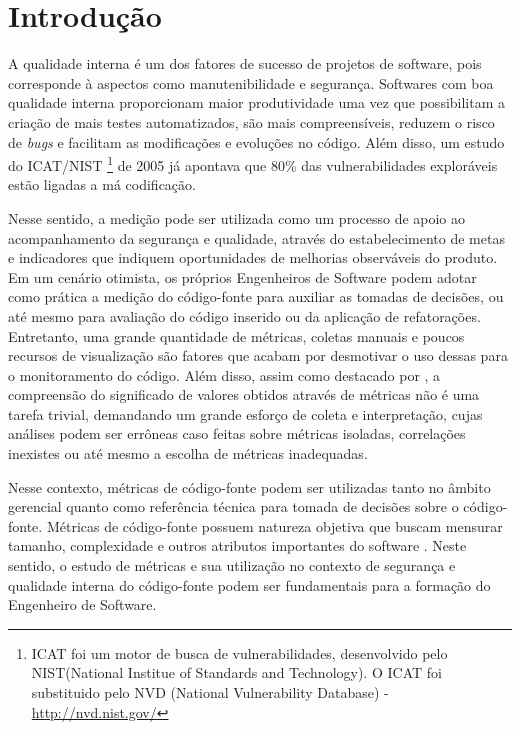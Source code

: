 \section{Introdução}
\label{introduction}

A qualidade interna é um dos fatores de sucesso de projetos de software, pois corresponde à aspectos como manutenibilidade e segurança. Softwares com boa qualidade interna proporcionam maior produtividade uma vez que possibilitam a criação de mais testes automatizados, são mais compreensíveis, reduzem o risco de \emph{bugs} e facilitam as modificações e evoluções no código.
%
Além disso, um estudo do ICAT/NIST
%
\footnote{ICAT foi um motor de busca de vulnerabilidades, desenvolvido pelo NIST(National Institue of Standards and Technology). O ICAT foi substituido pelo NVD (National Vulnerability Database) - \url{http://nvd.nist.gov/}}
%
de 2005 já apontava que 80\% das vulnerabilidades exploráveis estão ligadas a má codificação.

Nesse sentido, a medição pode ser utilizada como um processo de apoio ao acompanhamento da segurança e qualidade, através do estabelecimento de metas e indicadores que indiquem oportunidades de melhorias observáveis do produto. Em um cenário otimista,
os próprios Engenheiros de Software podem adotar como prática a medição do código-fonte para auxiliar as tomadas de decisões, ou até mesmo para avaliação do código inserido ou da aplicação de refatorações. Entretanto, uma grande quantidade de métricas, coletas manuais e poucos recursos de visualização são fatores que acabam por desmotivar o uso dessas para o monitoramento do código. Além disso, assim como destacado por \cite{chidamber1994}, a compreensão do significado de valores obtidos através de métricas não é uma tarefa trivial, demandando um grande esforço de coleta e interpretação, cujas análises podem ser errôneas caso feitas sobre métricas isoladas, correlações inexistes ou até mesmo a escolha de métricas inadequadas.

Nesse contexto, métricas de código-fonte podem ser utilizadas tanto no âmbito gerencial quanto como referência técnica para tomada de decisões sobre o código-fonte. Métricas de código-fonte possuem natureza objetiva que buscam mensurar tamanho, complexidade e outros atributos importantes do software \cite{henry1984kafura}\cite{troy1981zweben}\cite{yau1985zweben}\cite{systa2000}. Neste sentido, o estudo de métricas e sua utilização no contexto de segurança e qualidade interna do código-fonte podem ser fundamentais para a formação do Engenheiro de Software.

